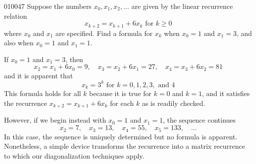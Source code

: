 \begin{example}{}{010047}
Suppose the numbers $x_{0}, x_{1}, x_{2}, \dots$ are given by the linear recurrence relation
\begin{equation*}
x_{k+2} = x_{k+1} +6x_k \mbox{ for } k \geq 0
\end{equation*}
where $x_{0}$ and $x_{1}$ are specified. Find a formula for $x_{k}$ when $x_{0} = 1$ and $x_{1} = 3$, and also when $x_{0} = 1$ and $x_{1} = 1$.


\begin{solution}
  If $x_{0} = 1$ and $x_{1} = 3$, then 
\begin{equation*}
x_{2} = x_{1} + 6x_{0} = 9, \quad x_{3} = x_{2} + 6x_{1} = 27, \quad x_{4} = x_{3} + 6x_{2} = 81
\end{equation*}
and it is apparent that
\begin{equation*}
x_k = 3^k \mbox{ for } k = 0, 1, 2, 3, \mbox{ and } 4
\end{equation*}
This formula holds for all $k$ because it is true for $k = 0$ and $k = 1$, and it satisfies the recurrence $x_{k+2} = x_{k+1} + 6x_{k}$ for each $k$ as is readily checked.


However, if we begin instead with $x_{0} = 1$ and $x_{1} = 1$, the sequence continues 
\begin{equation*}
x_{2} = 7, \quad x_{3} = 13, \quad x_{4} = 55, \quad x_{5} = 133, \quad \dots 
\end{equation*}
 In this case, the sequence is uniquely determined but no 
formula is apparent. Nonetheless, a simple device transforms the 
recurrence into a matrix recurrence to which our diagonalization 
techniques apply.



\end{solution}
\end{example}
